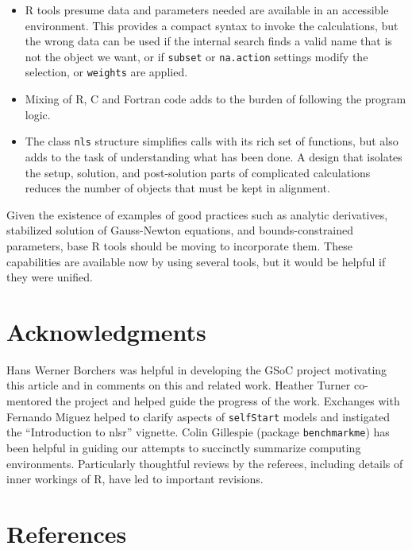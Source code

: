 \documentclass[
]{article}
\begin{document}
\begin{itemize}
\item
  R tools presume data and parameters needed are available in an
  accessible environment. This provides a compact syntax to invoke the
  calculations, but the wrong data can be used if the internal search
  finds a valid name that is not the object we want, or if
  \texttt{subset} or \texttt{na.action} settings modify the selection,
  or \texttt{weights} are applied.
\item
  Mixing of R, C and Fortran code adds to the burden of following the
  program logic.
\item
  The class \texttt{nls} structure simplifies calls with its rich set of
  functions, but also adds to the task of understanding what has been
  done. A design that isolates the setup, solution, and post-solution
  parts of complicated calculations reduces the number of objects that
  must be kept in alignment.
\end{itemize}

Given the existence of examples of good practices such as analytic
derivatives, stabilized solution of Gauss-Newton equations, and
bounds-constrained parameters, base R tools should be moving to
incorporate them. These capabilities are available now by using several
tools, but it would be helpful if they were unified.

\hypertarget{acknowledgments}{%
\section{Acknowledgments}\label{acknowledgments}}

Hans Werner Borchers was helpful in developing the GSoC project
motivating this article and in comments on this and related work.
Heather Turner co-mentored the project and helped guide the progress of
the work. Exchanges with Fernando Miguez helped to clarify aspects of
\texttt{selfStart} models and instigated the ``Introduction to nlsr''
vignette. Colin Gillespie (package \texttt{benchmarkme}) has been
helpful in guiding our attempts to succinctly summarize computing
environments. Particularly thoughtful reviews by the referees, including
details of inner workings of R, have led to important revisions.

\hypertarget{references}{%
\section*{References}\label{references}}
\end{document}
